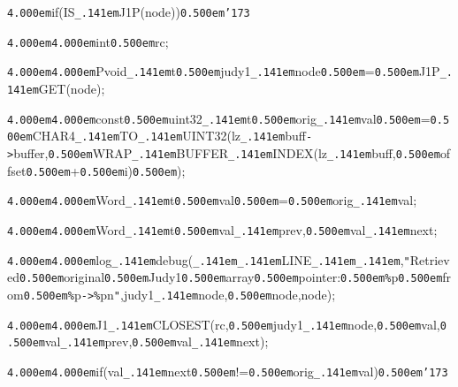 \noindent
{}\hfill

\noindent
{}{\tt\mc \kern4.000em}if(IS{\tt\_\kern.141em}J1P({\tt *}node)){\tt\mc \kern0.500em}{\tt\char'173}

\noindent
{}{\tt\mc \kern4.000em}{\tt\mc \kern4.000em}int{\tt\mc \kern0.500em}rc;

\noindent
{}{\tt\mc \kern4.000em}{\tt\mc \kern4.000em}Pvoid{\tt\_\kern.141em}t{\tt\mc \kern0.500em}judy1{\tt\_\kern.141em}node{\tt\mc \kern0.500em}={\tt\mc \kern0.500em}J1P{\tt\_\kern.141em}GET({\tt *}node);

\noindent
{}{\tt\mc \kern4.000em}{\tt\mc \kern4.000em}const{\tt\mc \kern0.500em}uint32{\tt\_\kern.141em}t{\tt\mc \kern0.500em}orig{\tt\_\kern.141em}val{\tt\mc \kern0.500em}={\tt\mc \kern0.500em}CHAR4{\tt\_\kern.141em}TO{\tt\_\kern.141em}UINT32(lz{\tt\_\kern.141em}buff{\tt -}{\tt >}buffer,{\tt\mc \kern0.500em}WRAP{\tt\_\kern.141em}BUFFER{\tt\_\kern.141em}INDEX(lz{\tt\_\kern.141em}buff,{\tt\mc \kern0.500em}offset{\tt\mc \kern0.500em}+{\tt\mc \kern0.500em}i){\tt\mc \kern0.500em});

\noindent
{}{\tt\mc \kern4.000em}{\tt\mc \kern4.000em}Word{\tt\_\kern.141em}t{\tt\mc \kern0.500em}val{\tt\mc \kern0.500em}={\tt\mc \kern0.500em}orig{\tt\_\kern.141em}val;

\noindent
{}{\tt\mc \kern4.000em}{\tt\mc \kern4.000em}Word{\tt\_\kern.141em}t{\tt\mc \kern0.500em}val{\tt\_\kern.141em}prev,{\tt\mc \kern0.500em}val{\tt\_\kern.141em}next;

\noindent
{}\hfill

\noindent
{}{\tt\mc \kern4.000em}{\tt\mc \kern4.000em}log{\tt\_\kern.141em}debug({\tt\_\kern.141em}{\tt\_\kern.141em}LINE{\tt\_\kern.141em}{\tt\_\kern.141em},{\tt "}Retrieved{\tt\mc \kern0.500em}original{\tt\mc \kern0.500em}Judy1{\tt\mc \kern0.500em}array{\tt\mc \kern0.500em}pointer:{\tt\mc \kern0.500em}{\tt\%}p{\tt\mc \kern0.500em}from{\tt\mc \kern0.500em}{\tt\%}p{\tt -}{\tt >}{\tt\%}p{\tt{}}n{\tt "},judy1{\tt\_\kern.141em}node,{\tt\mc \kern0.500em}node,{\tt *}node);

\noindent
{}\hfill

\noindent
{}{\tt\mc \kern4.000em}{\tt\mc \kern4.000em}J1{\tt\_\kern.141em}CLOSEST(rc,{\tt\mc \kern0.500em}judy1{\tt\_\kern.141em}node,{\tt\mc \kern0.500em}val,{\tt\mc \kern0.500em}val{\tt\_\kern.141em}prev,{\tt\mc \kern0.500em}val{\tt\_\kern.141em}next);

\noindent
{}\hfill

\noindent
{}{\tt\mc \kern4.000em}{\tt\mc \kern4.000em}if(val{\tt\_\kern.141em}next{\tt\mc \kern0.500em}!={\tt\mc \kern0.500em}orig{\tt\_\kern.141em}val){\tt\mc \kern0.500em}{\tt\char'173}

